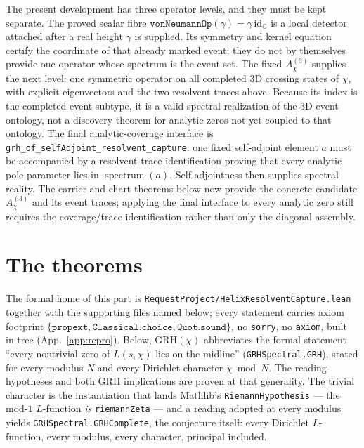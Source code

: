 The present development has three operator levels, and they must be kept
separate.  The proved scalar fibre
\(\texttt{vonNeumannOp}(\gamma)=\gamma\,\mathrm{id}_{\mathbb C}\) is a local
detector attached after a real height \(\gamma\) is supplied.  Its symmetry
and kernel equation certify the coordinate of that already marked event;
they do not by themselves provide one operator whose spectrum is the event
set.  The fixed \(A^{(3)}_\chi\) supplies the next level: one symmetric
operator on all completed 3D crossing states of \(\chi\), with explicit
eigenvectors and the two resolvent traces above.  Because its index is the
completed-event subtype, it is a valid spectral realization of the 3D event
ontology, not a discovery theorem for analytic zeros not yet coupled to that
ontology.  The final analytic-coverage interface is
\texttt{grh\_of\_selfAdjoint\_resolvent\_capture}: one fixed self-adjoint
element \(a\) must be accompanied by a resolvent-trace identification proving
that every analytic pole parameter lies in \(\operatorname{spectrum}(a)\).
Self-adjointness then supplies spectral reality.  The carrier and chart
theorems below now provide the concrete candidate \(A^{(3)}_\chi\) and its
event traces; applying the final interface to every analytic zero still
requires the coverage/trace identification rather than only the diagonal
assembly.

\section{The theorems}\label{sec:grh-theorems}

The formal home of this part is
\texttt{RequestProject/HelixResolventCapture.lean} together with the
supporting files named below; every statement carries axiom footprint
\(\{\texttt{propext},\texttt{Classical.choice},\texttt{Quot.sound}\}\), no
\texttt{sorry}, no \texttt{axiom}, built in-tree (App.~\ref{app:repro}).
Below, \(\mathrm{GRH}(\chi)\) abbreviates the formal statement ``every
nontrivial zero of \(L(s,\chi)\) lies on the midline''
(\texttt{GRHSpectral.GRH}), stated for every modulus \(N\) and every
Dirichlet character \(\chi\bmod N\). The reading-hypotheses and both GRH
implications are proven at that generality. The trivial character is the
instantiation that lands Mathlib's \texttt{RiemannHypothesis} --- the
mod-\(1\) \(L\)-function \emph{is} \texttt{riemannZeta} --- and a reading
adopted at every modulus yields \texttt{GRHSpectral.GRHComplete}, the
conjecture itself: every Dirichlet \(L\)-function, every modulus, every
character, principal included.

